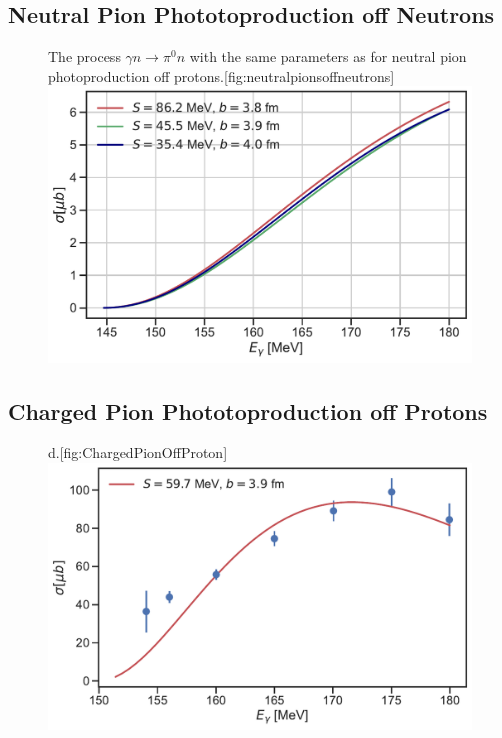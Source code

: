 \subsection{Neutral Pion Phototoproduction off Neutrons}
\begin{figure}[H]
    \begin{sidecaption}{The process $\gamma n \rightarrow \pi^0 n$ with the same parameters as for neutral pion photoproduction off protons.}[fig:neutralpionsoffneutrons]
    \includegraphics[width=\linewidth]{Figures/NeutralPionsOffNeutrons.pdf}
    \end{sidecaption}
\end{figure}
\subsection{Charged Pion Phototoproduction off Protons}
\begin{figure}[H]
	\begin{sidecaption}{d.}[fig:ChargedPionOffProton]
		\includegraphics[width=\linewidth]{Figures/ChargedPionOffProtonExact.pdf}
	\end{sidecaption}
\end{figure}
